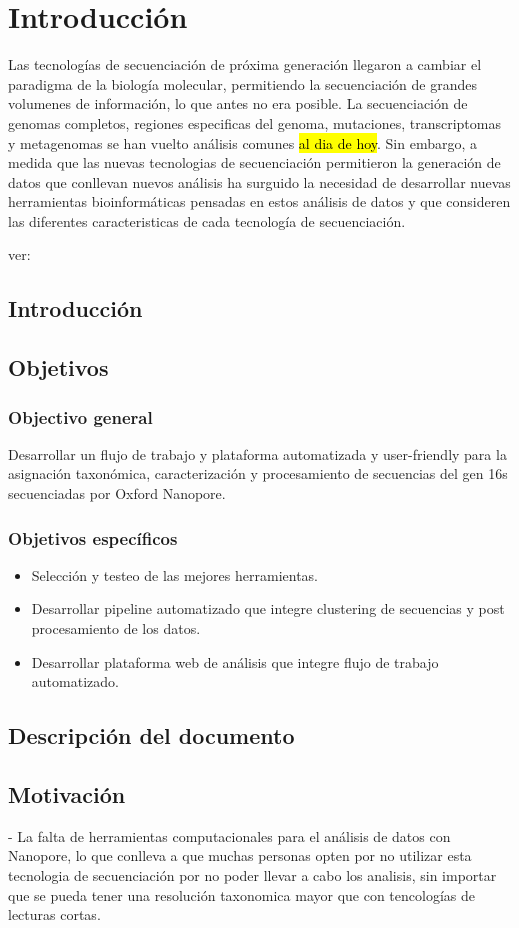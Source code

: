 \chapter{Introducción}
Las tecnologías de secuenciación de próxima generación llegaron a cambiar el paradigma de la biología molecular, permitiendo la secuenciación de grandes volumenes de información, lo que antes no era posible.
La secuenciación de genomas completos, regiones especificas del genoma, mutaciones, transcriptomas y metagenomas se han vuelto análisis comunes \hl{al dia de hoy}. Sin embargo, a medida que las nuevas tecnologias de secuenciación permitieron la generación de datos que conllevan nuevos análisis ha surguido la necesidad de desarrollar nuevas herramientas bioinformáticas pensadas en estos análisis de datos y que consideren las diferentes caracteristicas de cada tecnología de secuenciación.

ver:
\section{Introducción}
\section{Objetivos}
\subsection{Objectivo general}
Desarrollar un flujo de trabajo y plataforma automatizada y user-friendly para la asignación taxonómica, caracterización y procesamiento de secuencias del gen 16s secuenciadas por Oxford Nanopore.
\subsection{Objetivos específicos}
\begin{itemize}
    \item Selección y testeo de las mejores herramientas.
    \item Desarrollar pipeline automatizado que integre clustering de secuencias y post procesamiento de los datos.
    \item Desarrollar plataforma web de análisis que integre flujo de trabajo automatizado.
\end{itemize}
\section{Descripción del documento}
\section{Motivación}
 
- La falta de herramientas computacionales para el análisis de datos con Nanopore, lo que conlleva a que muchas personas opten por no utilizar esta tecnologia de secuenciación por no poder llevar a cabo los analisis, sin importar que se pueda tener una resolución taxonomica mayor que con tencologías de lecturas cortas.
